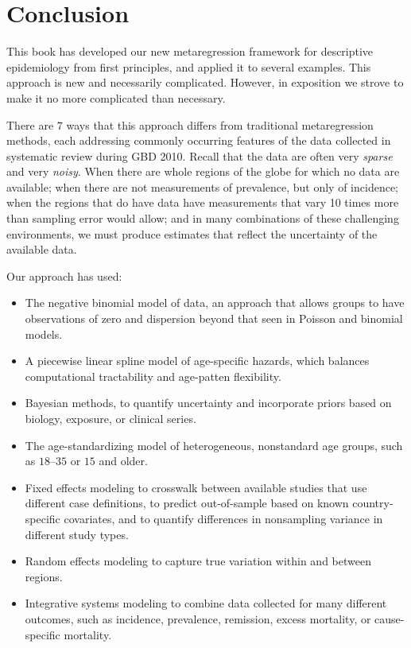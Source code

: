 \chapter{Conclusion}

This book has developed our new metaregression framework for
descriptive epidemiology from first principles, and applied it to
several examples.  This approach is new and necessarily complicated.
However, in exposition we strove to make it no more complicated than
necessary.

There are $7$ ways that this approach differs from traditional
metaregression methods, each addressing commonly occurring features of
the data collected in systematic review during GBD 2010.
Recall that the data are often very \emph{sparse} and very
\emph{noisy}.  When there are whole regions of the globe for which no
data are available; when there are not measurements of prevalence, but
only of incidence; when the regions that do have data have
measurements that vary 10 times more than sampling error would allow;
and in many combinations of these challenging environments, we must
produce estimates that reflect the uncertainty of the available data.

Our approach has used:
\begin{itemize}
\item The negative binomial model of data, an approach that allows groups to have
observations of zero and dispersion beyond that seen in Poisson and binomial models.

\item A piecewise linear spline model of age-specific hazards, which balances computational
tractability and age-patten flexibility.

\item Bayesian methods, to quantify uncertainty and incorporate priors
  based on biology, exposure, or clinical series.

\item The age-standardizing model of heterogeneous, nonstandard age groups, such as $18$--$35$
or $15$ and older.

\item Fixed effects modeling to crosswalk between available studies that use
different case definitions, to predict out-of-sample based on known
country-specific covariates, and to quantify differences in
nonsampling variance in different study types.

\item Random effects modeling to capture true variation within and between regions.

\item Integrative systems modeling to combine data collected for many different outcomes,
such as incidence, prevalence, remission, excess mortality, or
cause-specific mortality.
\end{itemize}

